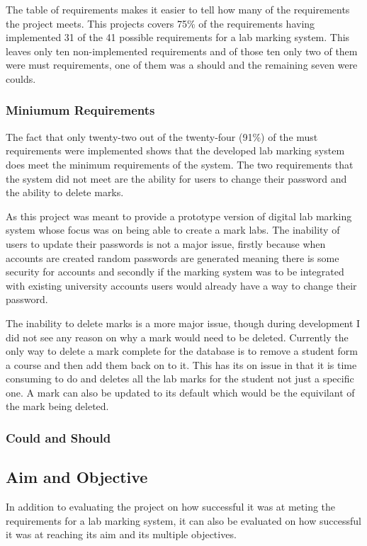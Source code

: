 \documentclass[12pt]{article}  %
\begin{document}
The table of requirements makes it easier to tell how many of the requirements the project meets. This projects covers 75\% of the requirements having implemented 31 of the 41 possible requirements for a lab marking system. This leaves only ten non-implemented requirements and of those ten only two of them were must requirements, one of them was a should and the remaining seven were coulds.

\subsubsection*{Miniumum Requirements}

The fact that only twenty-two out of the twenty-four (91\%) of the  must requirements were  implemented shows that the developed lab marking system does meet the minimum requirements of the system. The two requirements that the system did not meet are the ability for users to change their password and the ability to delete marks.

As this project was meant to provide a prototype version of digital lab marking system whose focus was on being able to create a mark labs. The inability of users to update their passwords is not a major issue, firstly because when accounts are created random passwords are generated meaning there is some security for accounts and secondly if the marking system was to be integrated with existing university accounts users would already have a way to change their password.

The inability to delete marks is a more major issue, though during development I did not see any reason on why a mark would need to be deleted. Currently the only way to delete a mark complete for the database is to remove a student form a course and then add them back on to it. This has its on issue in that it is time consuming to do and deletes all the lab marks for the student not just a specific one. A mark can also be updated to its default which would be the equivilant of the mark being deleted.

\subsubsection*{Could and Should}


\subsection{Aim and Objective}

In addition to evaluating the project on how successful it was at meting the requirements for a lab marking system, it can also be evaluated on how successful it was at reaching its aim and its multiple objectives.
\end{document}

